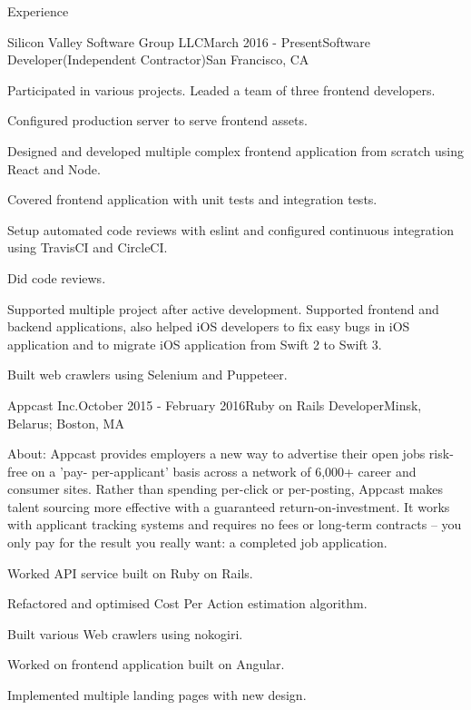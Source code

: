 \documentclass{resume}
\begin{document}
  
  \begin{rSection}{Experience}
  
    \begin{rSubsection}{Silicon Valley Software Group LLC}{March 2016 - Present}{Software Developer(Independent Contractor)}{San Francisco, CA}      
    \item Participated in various projects. Leaded a team of three frontend developers. 
    \item Configured production server to serve frontend assets. 
    \item Designed and developed multiple complex frontend application from scratch using React and Node. 
    \item Covered frontend application with unit tests and integration tests.
    \item Setup automated code reviews with eslint and configured continuous integration using TravisCI and CircleCI.
    \item Did code reviews.
    \item Supported multiple project after active development. Supported frontend and backend applications, also helped iOS developers to fix easy bugs in iOS application and to migrate iOS application from Swift 2 to Swift 3.
    \item Built web crawlers using Selenium and Puppeteer.
    \end{rSubsection}
  
    \begin{rSubsection}{Appcast Inc.}{October 2015 - February 2016}{Ruby on Rails Developer}{Minsk, Belarus; Boston, MA}
    \item About: Appcast provides employers a new way to advertise their open jobs risk-free on a 'pay- per-applicant' basis across a network of 6,000+ career and consumer sites. Rather than spending per-click or per-posting, Appcast makes talent sourcing more effective with a guaranteed return-on-investment. It works with applicant tracking systems and requires no fees or long-term contracts – you only pay for the result you really want: a completed job application.
    \item Worked API service built on Ruby on Rails. 
    \item Refactored and optimised Cost Per Action estimation algorithm.
    \item Built various Web crawlers using nokogiri.
    \item Worked on frontend application built on Angular.
    \item Implemented multiple landing pages with new design.
    \end{rSubsection}


\end{rSection}
\end{document}
